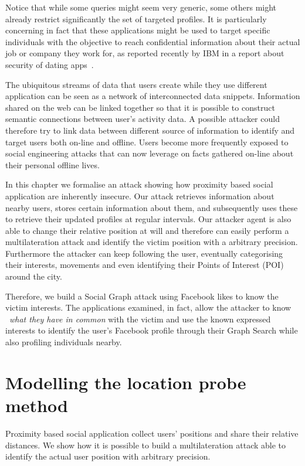 Notice that while some queries might seem very generic, some others might already restrict significantly the set of targeted profiles. It is particularly concerning in fact that these applications might be used to target specific individuals with the objective to reach confidential information about their actual job or company they work for, as reported recently by IBM in a report about security of dating apps~\cite{ibm2015report}.

The ubiquitous streams of data that users create while they use different application can be seen as a network of interconnected data snippets. Information shared on the web can be linked together so that it is possible to construct semantic connections between user's activity data. A possible attacker could therefore try to link data between different source of information to identify and target users both on-line and offline. Users become more frequently exposed to social engineering attacks that can now leverage on facts gathered on-line about their personal offline lives.

In this chapter we formalise an attack showing how proximity based social application are inherently insecure. Our attack retrieves information about nearby users, stores certain information about them, and subsequently uses these to retrieve their updated profiles at regular intervals. Our attacker agent is also able to change their relative position at will and therefore can easily perform a multilateration attack and identify the victim position with a arbitrary precision. Furthermore the attacker can keep following the user, eventually categorising their interests, movements and even identifying their Points of Interest (POI) around the city.

Therefore, we build a Social Graph attack using Facebook likes to know the victim interests. The applications examined, in fact, allow the attacker to know ~\emph{what they have in common} with the victim and use the known expressed interests to identify the user's Facebook profile through their Graph Search while also profiling individuals nearby.

\section{Modelling the location probe method}
\label{sec:loc-probe}
Proximity based social application collect users' positions and share their relative distances. We show how it is possible to build a multilateration attack able to identify the actual user position with arbitrary precision.

